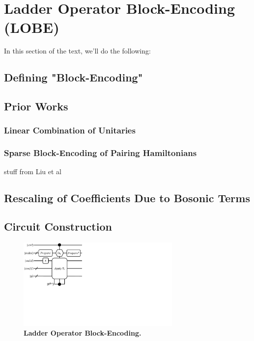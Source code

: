 \section{Ladder Operator Block-Encoding (LOBE)}
\label{sec:lobe}

In this section of the text, we'll do the following:
\subsection{Defining "Block-Encoding"}
\label{subsec:block-encoding}

\subsection{Prior Works}
\label{subsec:prior-works}

\subsubsection{Linear Combination of Unitaries}

\subsubsection{Sparse Block-Encoding of Pairing Hamiltonians}
stuff from Liu et al

\subsection{Rescaling of Coefficients Due to Bosonic Terms}
\label{subsec:rescaling}


\subsection{Circuit Construction}
\label{subsec:circuit}

\begin{figure}
    \centering
    \includegraphics[width=8cm]{figures/lobe-block-encoding.pdf}
    \caption{\textbf{Ladder Operator Block-Encoding.}
    }
    \label{fig:lobe}
\end{figure}


